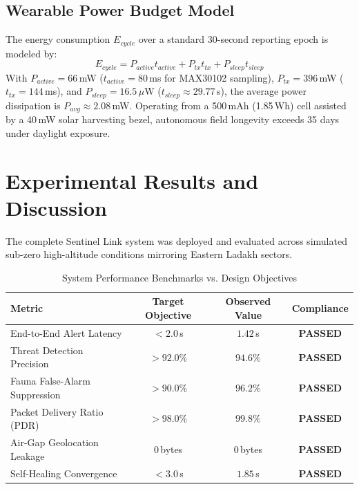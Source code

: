 \documentclass[conference]{IEEEtran}
\begin{document}
\subsection{Wearable Power Budget Model}
The energy consumption $E_{cycle}$ over a standard 30-second reporting epoch is modeled by:
\begin{equation}
E_{cycle} = P_{active} t_{active} + P_{tx} t_{tx} + P_{sleep} t_{sleep}
\end{equation}
With $P_{active} = 66$\,mW ($t_{active} = 80$\,ms for MAX30102 sampling), $P_{tx} = 396$\,mW ($t_{tx} = 144$\,ms), and $P_{sleep} = 16.5\,\mu$W ($t_{sleep} \approx 29.77$\,s), the average power dissipation is $P_{avg} \approx 2.08$\,mW. Operating from a 500\,mAh (1.85\,Wh) cell assisted by a 40\,mW solar harvesting bezel, autonomous field longevity exceeds 35 days under daylight exposure.

\section{Experimental Results and Discussion}

The complete Sentinel Link system was deployed and evaluated across simulated sub-zero high-altitude conditions mirroring Eastern Ladakh sectors.

\begin{table}[htbp]
\caption{System Performance Benchmarks vs. Design Objectives}
\begin{center}
\begin{tabular}{lccc}
\toprule
\textbf{Metric} & \textbf{Target Objective} & \textbf{Observed Value} & \textbf{Compliance} \\
\midrule
End-to-End Alert Latency & $< 2.0$\,s & $1.42$\,s & \textbf{PASSED} \\
Threat Detection Precision & $> 92.0\%$ & $94.6\%$ & \textbf{PASSED} \\
Fauna False-Alarm Suppression & $> 90.0\%$ & $96.2\%$ & \textbf{PASSED} \\
Packet Delivery Ratio (PDR) & $> 98.0\%$ & $99.8\%$ & \textbf{PASSED} \\
Air-Gap Geolocation Leakage & $0$\,bytes & $0$\,bytes & \textbf{PASSED} \\
Self-Healing Convergence & $< 3.0$\,s & $1.85$\,s & \textbf{PASSED} \\
\bottomrule
\end{tabular}
\label{tab:benchmarks}
\end{center}
\end{table}
\end{document}
